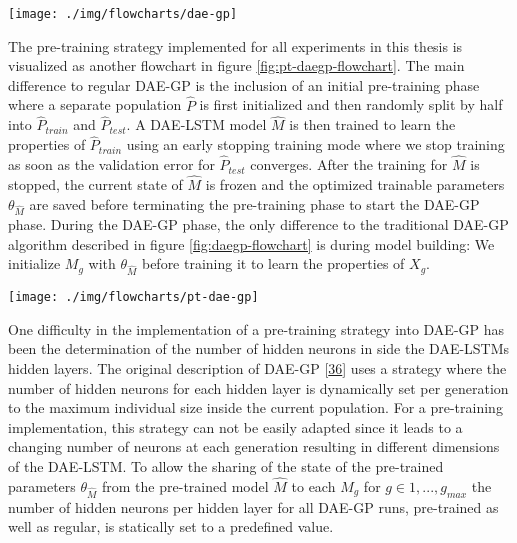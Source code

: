 \documentclass[
  11pt,
]{article}
\let\origfigure\figure
\let\endorigfigure\endfigure
\renewenvironment{figure}[1][2] {
    \expandafter\origfigure\expandafter[H]
} {
    \endorigfigure
}
\begin{document}
\begin{figure}[c]

{\centering \texttt{[image: ./img/flowcharts/dae-gp]} 

}

\caption{Regular DAE-GP Flowchart}\label{fig:daegp-flowchart}
\end{figure}

The pre-training strategy implemented for all experiments in this thesis is visualized as another flowchart in figure \ref{fig:pt-daegp-flowchart}.
The main difference to regular DAE-GP is the inclusion of an initial pre-training phase where a separate population \(\hat{P}\) is first initialized and then randomly split by half into \(\hat{P}_{train}\) and \(\hat{P}_{test}\).
A DAE-LSTM model \(\hat{M}\) is then trained to learn the properties of \(\hat{P}_{train}\) using an early stopping training mode where we stop training as soon as the validation error for \(\hat{P}_{test}\) converges.
After the training for \(\hat{M}\) is stopped, the current state of \(\hat{M}\) is frozen and the optimized trainable parameters \(\theta_{\hat{M}}\) are saved before terminating the pre-training phase to start the DAE-GP phase.
During the DAE-GP phase, the only difference to the traditional DAE-GP algorithm described in figure \ref{fig:daegp-flowchart} is during model building: We initialize \(M_g\) with \(\theta_{\hat{M}}\) before training it to learn the properties of \(X_g\).

\begin{figure}[c]

{\centering \texttt{[image: ./img/flowcharts/pt-dae-gp]} 

}

\caption{Pre-Trained DAE-GP Flowchart}\label{fig:pt-daegp-flowchart}
\end{figure}

One difficulty in the implementation of a pre-training strategy into DAE-GP has been the determination of the number of hidden neurons in side the DAE-LSTMs hidden layers.
The original description of DAE-GP {[}\protect\hyperlink{ref-dae-gp_2020_rtree}{36}{]} uses a strategy where the number of hidden neurons for each hidden layer is dynamically set per generation to the maximum individual size inside the current population.
For a pre-training implementation, this strategy can not be easily adapted since it leads to a changing number of neurons at each generation resulting in different dimensions of the DAE-LSTM.
To allow the sharing of the state of the pre-trained parameters \(\theta_{\hat{M}}\) from the pre-trained model \(\hat{M}\) to each \(M_g\) for \(g\in{1,...,g_{max}}\) the number of hidden neurons per hidden layer for all DAE-GP runs, pre-trained as well as regular, is statically set to a predefined value.
\end{document}
